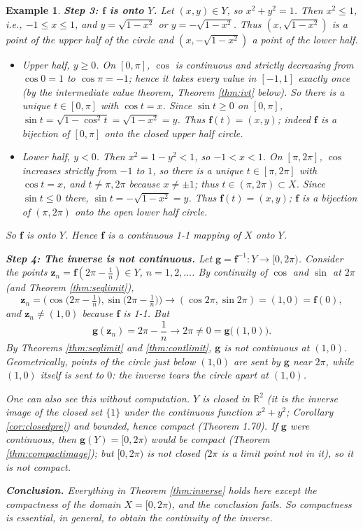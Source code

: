 \documentclass{article}
\theoremstyle{mythm}
\newtheorem{example}[theorem]{Example}
\begin{document}
\begin{example}
\textbf{Step 3: $\mathbf{f}$ is onto $Y$.} Let $(x,y) \in Y$, so $x^2 + y^2 = 1$. Then $x^2 \leq 1$, i.e., $-1 \leq x \leq 1$, and $y = \sqrt{1 - x^2}$ or $y = -\sqrt{1-x^2}$. Thus $(x, \sqrt{1-x^2})$ is a point of the upper half of the circle and $(x, -\sqrt{1-x^2})$ a point of the lower half.
\begin{itemize}
    \item \textit{Upper half, $y \geq 0$.} On $[0,\pi]$, $\cos$ is continuous and strictly decreasing from $\cos 0 = 1$ to $\cos\pi = -1$; hence it takes every value in $[-1,1]$ exactly once (by the intermediate value theorem, Theorem \ref{thm:ivt} below). So there is a unique $t \in [0,\pi]$ with $\cos t = x$. Since $\sin t \geq 0$ on $[0,\pi]$, $\sin t = \sqrt{1 - \cos^2 t} = \sqrt{1 - x^2} = y$. Thus $\mathbf{f}(t) = (x,y)$; indeed $\mathbf{f}$ is a bijection of $[0,\pi]$ onto the closed upper half circle.
    \item \textit{Lower half, $y < 0$.} Then $x^2 = 1 - y^2 < 1$, so $-1 < x < 1$. On $[\pi, 2\pi]$, $\cos$ increases strictly from $-1$ to $1$, so there is a unique $t \in [\pi, 2\pi]$ with $\cos t = x$, and $t \neq \pi, 2\pi$ because $x \neq \pm 1$; thus $t \in (\pi, 2\pi) \subset X$. Since $\sin t \leq 0$ there, $\sin t = -\sqrt{1 - x^2} = y$. Thus $\mathbf{f}(t) = (x,y)$; $\mathbf{f}$ is a bijection of $(\pi, 2\pi)$ onto the open lower half circle.
\end{itemize}
So $\mathbf{f}$ is onto $Y$. Hence $\mathbf{f}$ is a continuous 1-1 mapping of $X$ onto $Y$.

\textbf{Step 4: The inverse is not continuous.} Let $\mathbf{g} = \mathbf{f}^{-1} : Y \to [0, 2\pi)$. Consider the points $\mathbf{z}_n = \mathbf{f}(2\pi - \frac{1}{n}) \in Y$, $n = 1, 2, \dots$. By continuity of $\cos$ and $\sin$ at $2\pi$ (and Theorem \ref{thm:seqlimit}),
\[
\mathbf{z}_n = \Big(\cos\big(2\pi - \tfrac{1}{n}\big), \sin\big(2\pi - \tfrac{1}{n}\big)\Big) \to (\cos 2\pi, \sin 2\pi) = (1, 0) = \mathbf{f}(0),
\]
and $\mathbf{z}_n \neq (1,0)$ because $\mathbf{f}$ is 1-1. But
\[
\mathbf{g}(\mathbf{z}_n) = 2\pi - \frac{1}{n} \to 2\pi \neq 0 = \mathbf{g}\big((1,0)\big).
\]
By Theorems \ref{thm:seqlimit} and \ref{thm:contlimit}, $\mathbf{g}$ is not continuous at $(1,0)$. Geometrically, points of the circle just below $(1,0)$ are sent by $\mathbf{g}$ near $2\pi$, while $(1,0)$ itself is sent to $0$: the inverse tears the circle apart at $(1,0)$.

One can also see this without computation. $Y$ is closed in $\mathbb{R}^2$ (it is the inverse image of the closed set $\{1\}$ under the continuous function $x^2 + y^2$; Corollary \ref{cor:closedpre}) and bounded, hence compact (Theorem 1.70). If $\mathbf{g}$ were continuous, then $\mathbf{g}(Y) = [0,2\pi)$ would be compact (Theorem \ref{thm:compactimage}); but $[0, 2\pi)$ is not closed ($2\pi$ is a limit point not in it), so it is not compact.

\textbf{Conclusion.} Everything in Theorem \ref{thm:inverse} holds here except the compactness of the domain $X = [0, 2\pi)$, and the conclusion fails. So compactness is essential, in general, to obtain the continuity of the inverse.
\end{example}
\end{document}
